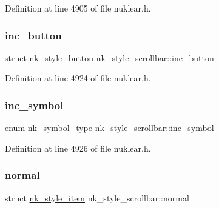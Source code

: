 Definition at line 4905 of file nuklear.\+h.

\mbox{\label{structnk__style__scrollbar_a3184981c83202a1633f77a6fa224ff98}} 
\subsubsection{\texorpdfstring{inc\+\_\+button}{inc\_button}}
{\footnotesize\ttfamily struct \mbox{\hyperlink{structnk__style__button}{nk\+\_\+style\+\_\+button}} nk\+\_\+style\+\_\+scrollbar\+::inc\+\_\+button}



Definition at line 4924 of file nuklear.\+h.

\mbox{\label{structnk__style__scrollbar_ae880b936bb999860f48aeb9ab52e6a93}} 
\subsubsection{\texorpdfstring{inc\+\_\+symbol}{inc\_symbol}}
{\footnotesize\ttfamily enum \mbox{\hyperlink{nuklear_8h_a29b4aaa400d0ce28aea3c8c9c372ac07}{nk\+\_\+symbol\+\_\+type}} nk\+\_\+style\+\_\+scrollbar\+::inc\+\_\+symbol}



Definition at line 4926 of file nuklear.\+h.

\mbox{\label{structnk__style__scrollbar_a381f8388c9dd0aaf9c4c249f4d7320b6}} 
\subsubsection{\texorpdfstring{normal}{normal}}
{\footnotesize\ttfamily struct \mbox{\hyperlink{structnk__style__item}{nk\+\_\+style\+\_\+item}} nk\+\_\+style\+\_\+scrollbar\+::normal}



